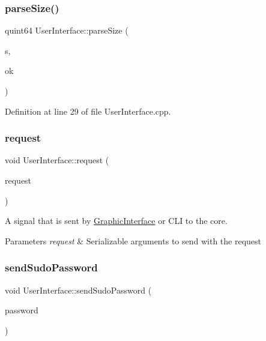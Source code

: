 \subsubsection{\texorpdfstring{parse\+Size()}{parseSize()}}
{\footnotesize\ttfamily quint64 User\+Interface\+::parse\+Size (\begin{DoxyParamCaption}\item[{Q\+String}]{s,  }\item[{bool $\ast$}]{ok }\end{DoxyParamCaption})\hspace{0.3cm}{\ttfamily [static]}}



Definition at line 29 of file User\+Interface.\+cpp.

\mbox{\label{class_user_interface_a99db050a753be9c1fc6071f73edd95f6}} 
\subsubsection{\texorpdfstring{request}{request}}
{\footnotesize\ttfamily void User\+Interface\+::request (\begin{DoxyParamCaption}\item[{Q\+Variant}]{request }\end{DoxyParamCaption})\hspace{0.3cm}{\ttfamily [signal]}}



A signal that is sent by \hyperlink{class_graphic_interface}{Graphic\+Interface} or C\+LI to the core. 


\begin{DoxyParams}{Parameters}
{\em request} & Serializable arguments to send with the request \\
\hline
\end{DoxyParams}
\mbox{\label{class_user_interface_a808baf8281c287a87568f9f3fd586350}} 
\subsubsection{\texorpdfstring{send\+Sudo\+Password}{sendSudoPassword}}
{\footnotesize\ttfamily void User\+Interface\+::send\+Sudo\+Password (\begin{DoxyParamCaption}\item[{Q\+String}]{password }\end{DoxyParamCaption})\hspace{0.3cm}{\ttfamily [signal]}}




